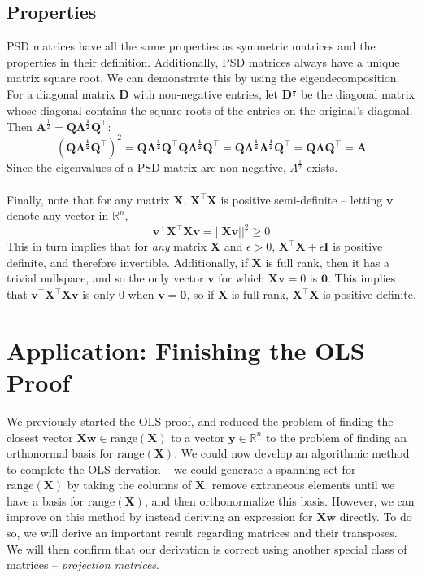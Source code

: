\documentclass{article}
\begin{document}
\subsection{Properties}
PSD matrices have all the same properties as symmetric matrices and the properties in their definition. Additionally, PSD matrices always have a unique matrix square root. We can demonstrate this by using the eigendecomposition. For a diagonal matrix $\mathbf{D}$ with non-negative entries, let $\mathbf{D}^{\frac{1}{2}}$ be the diagonal matrix whose diagonal contains the square roots of the entries on the original's diagonal. Then $\mathbf{A}^{\frac{1}{2}} = \mathbf{Q\Lambda^{\frac{1}{2}}Q^{\top}}$: $$(\mathbf{Q\Lambda^{\frac{1}{2}}Q^{\top}})^2 = \mathbf{Q\Lambda^{\frac{1}{2}}Q^{\top}Q\Lambda^{\frac{1}{2}}Q^{\top}} = \mathbf{Q\Lambda^{\frac{1}{2}}\Lambda^{\frac{1}{2}}Q^{\top}} = \mathbf{Q\Lambda Q^{\top}} = \mathbf{A}$$ Since the eigenvalues of a PSD matrix are non-negative, $\Lambda^{\frac{1}{2}}$ exists. \\\\
Finally, note that for any matrix $\mathbf{X}$, $\mathbf{X^{\top}X}$ is positive semi-definite -- letting $\mathbf{v}$ denote any vector in $\mathbb{R}^n$, $$\mathbf{v^{\top}X^{\top}Xv} = ||\mathbf{Xv}||^2 \geq 0$$
This in turn implies that for \textit{any} matrix $\mathbf{X}$ and $\epsilon > 0$, $\mathbf{X^{\top}X} + \epsilon\mathbf{I}$ is positive definite, and therefore invertible. Additionally, if $\mathbf{X}$ is full rank, then it has a trivial nullspace, and so the only vector $\mathbf{v}$ for which $\mathbf{Xv} = 0$ is $\mathbf{0}$. This implies that $\mathbf{v^{\top}X^{\top}Xv}$ is only 0 when $\mathbf{v} = \mathbf{0}$, so if $\mathbf{X}$ is full rank, $\mathbf{X^{\top}X}$ is positive definite.
\clearpage

\section*{Application: Finishing the OLS Proof}
We previously started the OLS proof, and reduced the problem of finding the closest vector $\mathbf{Xw} \in \text{range}(\mathbf{X})$ to a vector $\mathbf{y} \in \mathbb{R}^n$ to the problem of finding an orthonormal basis for $\text{range}(\mathbf{X})$. We could now develop an algorithmic method to complete the OLS dervation -- we could generate a spanning set for $\text{range}(\mathbf{X})$ by taking the columns of $\mathbf{X}$, remove extraneous elements until we have a basis for $\text{range}(\mathbf{X})$, and then orthonormalize this basis. However, we can improve on this method by instead deriving an expression for $\mathbf{Xw}$ directly. To do so, we will derive an important result regarding matrices and their transposes. We will then confirm that our derivation is correct using another special class of matrices -- \textit{projection matrices}.
\end{document}
